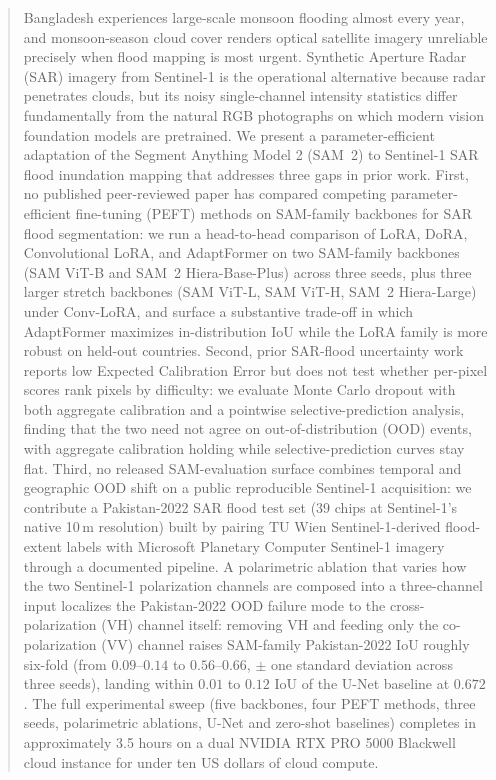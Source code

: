 \documentclass[conference]{IEEEtran}
\begin{document}
\begin{abstract}
Bangladesh experiences large-scale monsoon flooding almost every year, and monsoon-season cloud cover renders optical satellite imagery unreliable precisely when flood mapping is most urgent. Synthetic Aperture Radar (SAR) imagery from Sentinel-1 is the operational alternative because radar penetrates clouds, but its noisy single-channel intensity statistics differ fundamentally from the natural RGB photographs on which modern vision foundation models are pretrained. We present a parameter-efficient adaptation of the Segment Anything Model 2 (SAM~2) to Sentinel-1 SAR flood inundation mapping that addresses three gaps in prior work. First, no published peer-reviewed paper has compared competing parameter-efficient fine-tuning (PEFT) methods on SAM-family backbones for SAR flood segmentation: we run a head-to-head comparison of LoRA, DoRA, Convolutional LoRA, and AdaptFormer on two SAM-family backbones (SAM ViT-B and SAM~2 Hiera-Base-Plus) across three seeds, plus three larger stretch backbones (SAM ViT-L, SAM ViT-H, SAM~2 Hiera-Large) under Conv-LoRA, and surface a substantive trade-off in which AdaptFormer maximizes in-distribution IoU while the LoRA family is more robust on held-out countries. Second, prior SAR-flood uncertainty work reports low Expected Calibration Error but does not test whether per-pixel scores rank pixels by difficulty: we evaluate Monte Carlo dropout with both aggregate calibration and a pointwise selective-prediction analysis, finding that the two need not agree on out-of-distribution (OOD) events, with aggregate calibration holding while selective-prediction curves stay flat. Third, no released SAM-evaluation surface combines temporal and geographic OOD shift on a public reproducible Sentinel-1 acquisition: we contribute a Pakistan-2022 SAR flood test set (39 chips at Sentinel-1's native 10\,m resolution) built by pairing TU Wien Sentinel-1-derived flood-extent labels with Microsoft Planetary Computer Sentinel-1 imagery through a documented pipeline. A polarimetric ablation that varies how the two Sentinel-1 polarization channels are composed into a three-channel input localizes the Pakistan-2022 OOD failure mode to the cross-polarization (VH) channel itself: removing VH and feeding only the co-polarization (VV) channel raises SAM-family Pakistan-2022 IoU roughly six-fold (from $0.09$--$0.14$ to $0.56$--$0.66$, $\pm$ one standard deviation across three seeds), landing within $0.01$ to $0.12$ IoU of the U-Net baseline at $0.672$. The full experimental sweep (five backbones, four PEFT methods, three seeds, polarimetric ablations, U-Net and zero-shot baselines) completes in approximately 3.5 hours on a dual NVIDIA RTX PRO 5000 Blackwell cloud instance for under ten US dollars of cloud compute.
\end{abstract}
\end{document}
